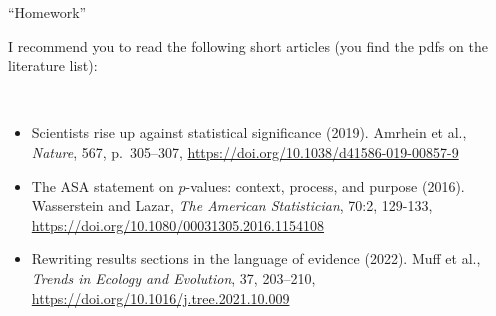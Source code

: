\documentclass[
  10pt,
  ignorenonframetext,
]{beamer}
\providecommand{\tightlist}{%
  \setlength{\itemsep}{0pt}\setlength{\parskip}{0pt}}
\begin{document}
\begin{frame}{``Homework''}
\protect\hypertarget{homework}{}
\(~\)

I recommend you to read the following short articles (you find the pdfs
on the literature list):

\(~\)

\begin{itemize}
\tightlist
\item
  Scientists rise up against statistical significance (2019). Amrhein et
  al., \emph{Nature}, 567, p.~305--307,
  \url{https://doi.org/10.1038/d41586-019-00857-9}
\end{itemize}

\vspace{2mm}

\begin{itemize}
\tightlist
\item
  The ASA statement on \(p\)-values: context, process, and purpose
  (2016). Wasserstein and Lazar, \emph{The American Statistician}, 70:2,
  129-133, \url{https://doi.org/10.1080/00031305.2016.1154108}
\end{itemize}

\vspace{2mm}

\begin{itemize}
\tightlist
\item
  Rewriting results sections in the language of evidence (2022). Muff et
  al., \emph{Trends in Ecology and Evolution}, 37, 203--210,
  \url{https://doi.org/10.1016/j.tree.2021.10.009}
\end{itemize}
\end{frame}
\end{document}
